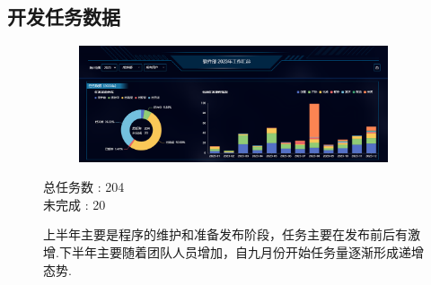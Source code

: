 \documentclass[AutoFakeBold,AutoFakeSlant]{beamer}
\begin{document}
	\subsection{开发任务数据}
	\begin{frame}[fragile]
		\begin{figure}
			\centering %
			\begin{subfigure}{\linewidth}
				\includegraphics[width=\linewidth]{Task}
			\end{subfigure} 
			
			\begin{minipage}[l]{0.3\linewidth}
				\large
				总任务数 : 204 \\
				未完成  : 20
			\end{minipage}\hfill
			\begin{minipage}[l]{0.6\linewidth}
				\footnotesize
				上半年主要是程序的维护和准备发布阶段，任务主要在发布前后有激增.下半年主要随着团队人员增加，自九月份开始任务量逐渐形成递增态势.
			\end{minipage}
		\end{figure}
	\end{frame}
	
	
\end{document}
